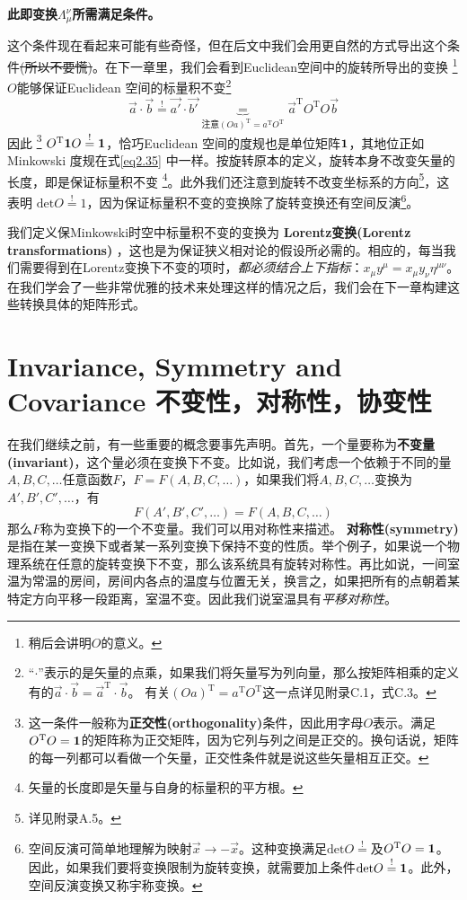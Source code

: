 {\bf{此即变换$\Lambda_\mu^\nu$所需满足条件。}}

这个条件现在看起来可能有些奇怪，但在后文中我们会用更自然的方式导出这个条件\sout{(所以不要慌)}。在下一章里，我们会看到Euclidean空间中的旋转所导出的变换
\footnote{稍后会讲明$O$的意义。}$O$能够保证Euclidean 空间的标量积不变\footnote{“$\cdot$”表示的是矢量的点乘，如果我们将矢量写为列向量，那么按矩阵相乘的定义有的$\vec{a}\cdot\vec{b}=\vec{a}^\mathrm{T}\cdot\vec{b}$。 有关$(Oa)^\mathrm{T}=a^\mathrm{T}O^\mathrm{T}$这一点详见附录C.1，式C.3。}%
\begin{equation}\label{eq2.36}
  \vec{a} \cdot \vec{b}
  \overset{\text{!}}{=}
  \vec{a'} \cdot \vec{b'}
  \!\!\!\!\!\!\!\!\!\!
  \underbrace{=}_{\text{注意}
  (Oa)^\mathrm{T}=a^\mathrm{T}O^\mathrm{T}}
  \!\!\!\!\!\!\!\!\!\!
  \vec{a}^\mathrm{T} O^\mathrm{T} O\vec{b}
\end{equation}
因此%
\footnote{这一条件一般称为{\bf{正交性(orthogonality)}}条件，因此用字母$O$表示。满足$O^\mathrm{T} O={\bf{1}}$的矩阵称为正交矩阵，因为它列与列之间是正交的。换句话说，矩阵的每一列都可以看做一个矢量，正交性条件就是说这些矢量相互正交。}
%
$O^\mathrm{T} {\bf{1}} O\overset{\text{!}}{=}{\bf{1}}$，恰巧Euclidean 空间的度规也是单位矩阵${\bf{1}}$，其地位正如Minkowski 度规在式\ref{eq2.35} 中一样。按旋转原本的定义，旋转本身不改变矢量的长度，即是保证标量积不变
\footnote{矢量的长度即是矢量与自身的标量积的平方根。}。此外我们还注意到旋转不改变坐标系的方向\footnote{详见附录A.5。}，这表明 $\text{det}O \overset{\text{!}}{=}1$，因为保证标量积不变的变换除了旋转变换还有空间反演\footnote{空间反演可简单地理解为映射$\vec{x}\rightarrow -\vec{x}$。这种变换满足$\text{det}O \overset{\text{!}}{=}$及$O^{\mathrm{T}}O={\bf{1}}$。 因此，如果我们要将变换限制为旋转变换，就需要加上条件$\text{det}O \overset{\text{!}}{=} {\bf{1}}$。此外，空间反演变换又称宇称变换。}。

我们定义保Minkowski时空中标量积不变的变换为
{\bf{Lorentz变换(Lo\-rentz transformations)}}
，这也是为保证狭义相对论的假设所必需的。相应的，每当我们需要得到在Lorentz变换下不变的项时，{\it{都必须结合上下指标}}：$x_\mu y^\mu=x_\mu y_\nu \eta^{\mu\nu}$。
在我们学会了一些非常优雅的技术来处理这样的情况之后，我们会在下一章构建这些转换具体的矩阵形式。
\section[不变性，对称性，协变性]{Invariance, Symmetry and Covariance 不变性，对称性，协变性}
在我们继续之前，有一些重要的概念要事先声明。首先，一个量要称为{\bf{不变量(invariant)}}，这个量必须在变换下不变。比如说，我们考虑一个依赖于不同的量$A,B,C,\dots$任意函数$ F$，$F=F(A,B,C,\dots)$，如果我们将$A,B,C,\dots$变换为$A',B',C',\dots$，有
\begin{equation}\label{eq2.37}
  F(A',B',C',\dots)=F(A,B,C,\dots)
\end{equation}
那么$F$称为变换下的一个不变量。我们可以用对称性来描述。
{\bf{对称性(symmetry)}}是指在某一变换下或者某一系列变换下保持不变的性质。举个例子，如果说一个物理系统在任意的旋转变换下不变，那么该系统具有旋转对称性。再比如说，一间室温为常温的房间，房间内各点的温度与位置无关，换言之，如果把所有的点朝着某特定方向平移一段距离，室温不变。因此我们说室温具有{\it{平移对称性}}。%

